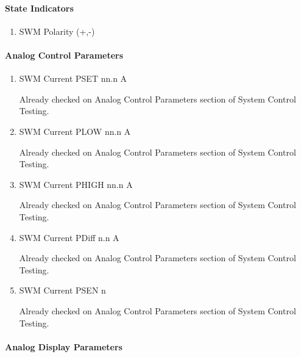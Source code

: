 \documentclass[11pt]{book}		%
\begin{document}
\paragraph{State Indicators}

\begin{enumerate}
 \item SWM Polarity (+,-)
\end{enumerate}

\paragraph{Analog Control Parameters}

\begin{enumerate}
 \item SWM Current PSET   nn.n A

\color{red}
Already checked on Analog Control Parameters section of System Control Testing.
\color{black}

 \item SWM Current PLOW   nn.n A

\color{red}
Already checked on Analog Control Parameters section of System Control Testing.
\color{black}

 \item SWM Current PHIGH  nn.n A

\color{red}
Already checked on Analog Control Parameters section of System Control Testing.
\color{black}

 \item SWM Current PDiff n.n A

\color{red}
Already checked on Analog Control Parameters section of System Control Testing.
\color{black}

 \item SWM Current PSEN  n

\color{red}
Already checked on Analog Control Parameters section of System Control Testing.
\color{black}

\end{enumerate}

\paragraph{Analog Display Parameters}
\end{document}
